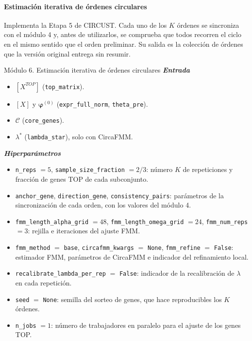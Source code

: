 \documentclass[12pt, a4paper]{report}
\newcommand{\dato}[2]{{\boldmath\textcolor{#1}{#2}}}
\begin{document}
\paragraph{Estimación iterativa de órdenes circulares}
Implementa la Etapa 5 de CIRCUST. Cada uno de los \(K\) órdenes se sincroniza con el módulo 4 y, antes de utilizarlos, se comprueba que todos recorren el ciclo en el mismo sentido que el orden preliminar. Su salida es la colección de órdenes que la versión original entrega sin resumir.

\begin{panel}{Módulo 6. Estimación iterativa de órdenes circulares}
\textit{\textbf{Entrada}}
\begin{itemize}[nosep,leftmargin=1.5em]
\item \dato{dT}{\([X^{TOP}]\) (\texttt{top\_matrix})}.
\item \dato{dX}{\([X]\) y \(\boldsymbol{\varphi}^{(0)}\) (\texttt{expr\_full\_norm}, \texttt{theta\_pre})}.
\item \dato{dC}{\(\mathcal{C}\) (\texttt{core\_genes})}.
\item \dato{dL}{\(\lambda^{*}\) (\texttt{lambda\_star})}, solo con CircaFMM.
\end{itemize}

\textit{\textbf{Hiperparámetros}}
\begin{itemize}[nosep,leftmargin=1.5em]
\item \texttt{n\_reps} \(=5\), \texttt{sample\_size\_fraction} \(=2/3\): número \(K\) de repeticiones y fracción de genes TOP de cada subconjunto.
\item \texttt{anchor\_gene}, \texttt{direction\_gene}, \texttt{consistency\_pairs}: parámetros de la sincronización de cada orden, con los valores del módulo 4.
\item \texttt{fmm\_length\_alpha\_grid} \(=48\), \texttt{fmm\_length\_omega\_grid} \(=24\), \texttt{fmm\_num\_reps} \(=3\): rejilla e iteraciones del ajuste FMM.
\item \texttt{fmm\_method} \(=\) \texttt{base}, \texttt{circafmm\_kwargs} \(=\) \texttt{None}, \texttt{fmm\_refine} \(=\) \texttt{False}: estimador FMM, parámetros de CircaFMM e indicador del refinamiento local.
\item \texttt{recalibrate\_lambda\_per\_rep} \(=\) \texttt{False}: indicador de la recalibración de \(\lambda\) en cada repetición.
\item \texttt{seed} \(=\) \texttt{None}: semilla del sorteo de genes, que hace reproducibles los \(K\) órdenes.
\item \texttt{n\_jobs} \(=1\): número de trabajadores en paralelo para el ajuste de los genes TOP.
\end{itemize}


\end{panel}
\end{document}
